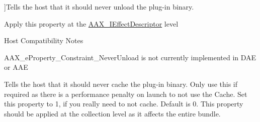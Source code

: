 \begin{Desc}
\begin{description}
{}]Tells the host that it should never unload the plug-\/in binary. \begin{DoxyItemize}
\item Apply this property at the \hyperlink{a00096}{A\+A\+X\+\_\+\+I\+Effect\+Descriptor} level\end{DoxyItemize}
\begin{DoxyRefDesc}{Host Compatibility Notes}
\item[\hyperlink{a00380__compatibility_notes000068}{Host Compatibility Notes}]A\+A\+X\+\_\+e\+Property\+\_\+\+Constraint\+\_\+\+Never\+Unload is not currently implemented in D\+A\+E or A\+A\+E \end{DoxyRefDesc}
\item[{\em 
\hypertarget{a00283_a6571f4e41a5dd06e4067249228e2249ea77be51d1855af1b15fbc233097844cdf}{}A\+A\+X\+\_\+e\+Property\+\_\+\+Constraint\+\_\+\+Never\+Cache\label{a00283_a6571f4e41a5dd06e4067249228e2249ea77be51d1855af1b15fbc233097844cdf}
}]Tells the host that it should never cache the plug-\/in binary. Only use this if required as there is a performance penalty on launch to not use the Cache. Set this property to 1, if you really need to not cache. Default is 0. This property should be applied at the collection level as it affects the entire bundle.


\end{description}
\end{Desc}
